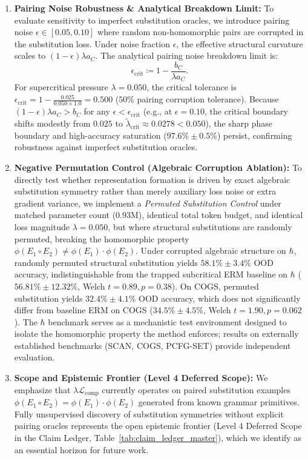 \documentclass{article}
\theoremstyle{plain}
\theoremstyle{definition}
\begin{document}
\begin{enumerate}[leftmargin=*,noitemsep]
\begin{itemize}[noitemsep]
    \end{itemize}
    \item \textbf{Pairing Noise Robustness \& Analytical Breakdown Limit:} To evaluate sensitivity to imperfect substitution oracles, we introduce pairing noise $\epsilon \in [0.05, 0.10]$ where random non-homomorphic pairs are corrupted in the substitution loss. Under noise fraction $\epsilon$, the effective structural curvature scales to $(1 - \epsilon) \lambda a_C$. The analytical pairing noise breakdown limit is:
    \begin{equation}
        \epsilon_{\text{crit}} \coloneqq 1 - \frac{b_C}{\lambda a_C}.
        \label{eq:epsilon_crit}
    \end{equation}
    For supercritical pressure $\lambda = 0.050$, the critical tolerance is $\epsilon_{\text{crit}} = 1 - \frac{0.025}{0.050 \times 1.0} = 0.500$ ($50\%$ pairing corruption tolerance). Because $(1 - \epsilon)\lambda a_C > b_C$ for any $\epsilon < \epsilon_{\text{crit}}$ (e.g., at $\epsilon = 0.10$, the critical boundary shifts modestly from $0.025$ to $\tilde{\lambda}_{\text{crit}} \approx 0.0278 < 0.050$), the sharp phase boundary and high-accuracy saturation ($97.6\% \pm 0.5\%$) persist, confirming robustness against imperfect substitution oracles.
    \item \textbf{Negative Permutation Control (Algebraic Corruption Ablation):} To directly test whether representation formation is driven by exact algebraic substitution symmetry rather than merely auxiliary loss noise or extra gradient variance, we implement a \emph{Permuted Substitution Control} under matched parameter count ($0.93\text{M}$), identical total token budget, and identical loss magnitude $\lambda = 0.050$, but where structural substitutions are randomly permuted, breaking the homomorphic property $\phi(E_1 \circ E_2) \neq \phi(E_1) \cdot \phi(E_2)$. Under corrupted algebraic structure on $\hbar$, randomly permuted structural substitution yields $58.1\% \pm 3.4\%$ OOD accuracy, indistinguishable from the trapped subcritical ERM baseline on $\hbar$ ($56.81\% \pm 12.32\%$, Welch $t = 0.89, p = 0.38$). On COGS, permuted substitution yields $32.4\% \pm 4.1\%$ OOD accuracy, which does not significantly differ from baseline ERM on COGS ($34.5\% \pm 4.5\%$, Welch $t = 1.90, p = 0.062$). The $\hbar$ benchmark serves as a mechanistic test environment designed to isolate the homomorphic property the method enforces; results on externally established benchmarks (SCAN, COGS, PCFG-SET) provide independent evaluation.
    \item \textbf{Scope and Epistemic Frontier (Level 4 Deferred Scope):} We emphasize that $\lambda \mathcal{L}_{\text{comp}}$ currently operates on paired substitution examples $\phi(E_1 \circ E_2) = \phi(E_1) \cdot \phi(E_2)$ generated from known grammar primitives. Fully unsupervised discovery of substitution symmetries without explicit pairing oracles represents the open epistemic frontier (Level 4 Deferred Scope in the Claim Ledger, Table~\ref{tab:claim_ledger_master}), which we identify as an essential horizon for future work.
\end{enumerate}
\end{document}

